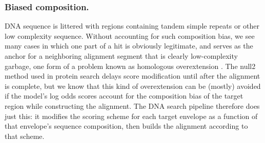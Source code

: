 \subsubsection{Biased composition.}

DNA sequence is littered with regions containing tandem simple repeats or other 
low complexity sequence. Without accounting for such composition bias, we see
many cases in which one part of a hit is obviously legitimate, and serves as the
anchor for a neighboring alignment segment that is clearly low-complexity
garbage, one form of a problem known as homologous overextension
\citep{Gonzalez10}. The null2 method used in protein search delays score
modification until after the alignment is complete, but we know that
this kind of overextension can be (mostly) avoided if the model's log odds
scores account for the composition bias of the target region while constructing
the alignment. The DNA search pipeline therefore does just this: it modifies
the scoring scheme for each target envelope as a function of that envelope's
sequence composition, then builds the alignment according to that scheme.





